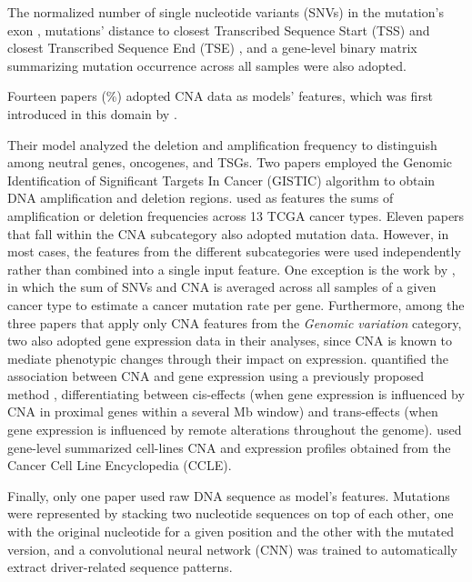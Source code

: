 The normalized number of single nucleotide variants (SNVs) in the mutation's exon \cite{Mao2013}, mutations' distance to closest Transcribed Sequence Start (TSS) and closest Transcribed Sequence End (TSE) \cite{Agajanian2019}, and a gene-level binary matrix summarizing mutation occurrence across all samples \cite{LI2016,Xi2019} were also adopted. 

Fourteen papers (\%) \cite{Davoli2013, Schroeder2014, Gnad2015, Park2015, Dong2016, LI2016, Park2017, Guan2018, Lu2018, Jiang2019, Schulte-Sasse2019, Xi2019, Lyu2020, Nulsen2021} adopted CNA data as models' features, which was first introduced in this domain by \citet{Davoli2013}. 

Their model analyzed the deletion and amplification frequency to distinguish among neutral genes, oncogenes, and TSGs.
Two papers \cite{Gnad2015, LI2016} employed the Genomic Identification of Significant Targets In Cancer (GISTIC) \cite{gistic, gistic2} algorithm to obtain DNA amplification and deletion regions. 
\citet{Gnad2015} used as features the sums of amplification or deletion frequencies across 13 TCGA cancer types. Eleven papers that fall within the CNA subcategory also adopted mutation data. However, in most cases, the features from the different subcategories were used independently rather than combined into a single input feature. One exception is the work by \citet{Schulte-Sasse2019}, in which the sum of SNVs and CNA is averaged across all samples of a given cancer type to estimate a cancer mutation rate per gene. Furthermore, among the three papers that apply only CNA features from the \textit{Genomic variation} category, two \cite{Park2017, Guan2018} also adopted gene expression data in their analyses, since CNA is known to mediate phenotypic changes through their impact on expression. \citet{Park2017} quantified the association between CNA and gene expression using a previously proposed method \cite{yuan2011sparse}, differentiating between cis-effects (\ie when gene expression is influenced by CNA in proximal genes within a several Mb window) and trans-effects (\ie  when gene expression is influenced by remote alterations throughout the genome). \citet{Guan2018} used gene-level summarized cell-lines CNA and expression profiles obtained from the Cancer Cell Line Encyclopedia (CCLE). 

Finally, only one paper \cite{Agajanian2019} used raw DNA sequence as model's features. Mutations were represented by stacking two nucleotide sequences on top of each other, one with the original nucleotide for a given position and the other with the mutated version, and a convolutional neural network (CNN) was trained to automatically extract driver-related sequence patterns. 


